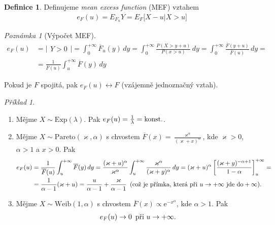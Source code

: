 \documentclass{article}
\theoremstyle{remark}
\newtheorem*{remark}{Poznámka}
\theoremstyle{plain}
\theoremstyle{definition}
\newtheorem{definition}[subsubsection]{Definice}
\theoremstyle{remark}
\newtheorem*{example}{Příklad}
\begin{document}
\begin{definition}
Definujeme \textit{mean excess function} (MEF) vztahem
\begin{align*}
    e_F(u)=E_{F_u}Y=E_F\big[X-u|X>u\big]
\end{align*}
\end{definition}

\begin{remark}[Výpočet MEF]
\begin{align*}
    e_F(u)&=\Big|\begin{array}{c}
    Y>0
    \end{array}\Big|=\int_0^{+\infty} \overline{F}_u(y)\,dy=\int_0^{+\infty}\frac{P(X>y+u)}{P(x>u)}\,dy=\int_0^{+\infty}\frac{\overline{F}(y+u)}{\overline{F}(u)}\,dy= \\
    &=\frac{1}{\overline{F}(u)}\int_u^{+\infty}\overline{F}(y)\,dy
\end{align*}

Pokud je $F$ spojitá, pak $e_F(u)\leftrightarrow F$ (vzájemně jednoznačný vztah).
\end{remark}

\begin{example}
\begin{enumerate}
    \item Mějme $X\sim\mathrm{Exp}(\lambda)$. Pak $e_F(u)=\frac{1}{\lambda}=\textnormal{konst.}$.
    \item Mějme $X\sim\mathrm{Pareto}(\varkappa,\alpha)$ s chvostem $\overline{F}(x)=\frac{\varkappa^\alpha}{(\varkappa+x)^\alpha}$, kde $\varkappa>0$, $\alpha>1$ a $x>0$. Pak
    \begin{align*}
        e_F(u)&=\frac{1}{\overline{F}(u)}\int_u^{+\infty}\overline{F}(y)\,dy=\frac{(\varkappa+u)^\alpha}{\varkappa^\alpha}\int_u^{+\infty}\frac{\varkappa^\alpha}{(\varkappa+y)^\alpha}\,dy=(\varkappa+u)^\alpha\left[\frac{(\varkappa+y)^{-\alpha+1}}{1-\alpha}\right]_u^{+\infty}= \\
        &=\frac{1}{\alpha-1}(\varkappa+u)=\frac{u}{\alpha-1}+\frac{\varkappa}{\alpha-1}\,\textnormal{ (což je přímka, která při }u\rightarrow+\infty\textnormal{ jde do}+\infty).
    \end{align*}
    \item Mějme $X\sim\mathrm{Weib}(1,\alpha)$ s chvostem $\overline{F}(x)\propto\mathrm{e}^{-x^\alpha}$, kde $\alpha>1$. Pak
    \begin{align*}
        e_F(u)\rightarrow 0\,\textnormal{ při }u\rightarrow+\infty.
    \end{align*}
\end{enumerate}
\end{example}
\end{document}
